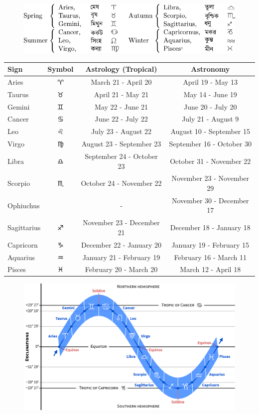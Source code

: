 \documentclass[a4paper,12pt]{extarticle}
\begin{document}
\begin{enumerate}
	\begin{figure}[H]
		\centering
		\includegraphics[width=0.7\linewidth]{zodiac.pdf}
	\end{figure}

\begin{table}[H]
	\centering
\begin{tabular}{|l|c|c|c|}
	\hline 
	\textbf{Sign} & \textbf{Symbol} & \textbf{Astrology (Tropical)} & \textbf{Astronomy} \\ 
	\hline 
	Aries & $\aries$ & March 21 - April 20 & April 19 - May 13 \\ 
	\hline 
	Taurus & $\taurus$ & April 21 - May 21 & May 14 - June 19 \\ 
	\hline 
	Gemini & $\gemini$ & May 22 - June 21 & June 20 - July 20 \\ 
	\hline 
	Cancer & $\cancer$ & June 22 - July 22 & July 21 - August 9 \\ 
	\hline 
	Leo & $\leo$ & July 23 - August 22 & August 10 - September 15 \\ 
	\hline 
	Virgo & $\virgo$ & August 23 - September 23 & September 16 - October 30 \\ 
	\hline 
	Libra & $\libra$ & September 24 - October 23 & October 31 - November 22 \\ 
	\hline 
	Scorpio & $\scorpio$ & October 24 - November 22 & November 23 - November 29 \\ 
	\hline 
	Ophiuchus &  & - & November 30 - December 17 \\ 
	\hline 
	Sagittarius & $\sagittarius$ & November 23 - December 21 & December 18 - January 18 \\ 
	\hline 
	Capricorn & $\capricornus$ & December 22 - January 20 & January 19 - February 15 \\ 
	\hline 
	Aquarius & $\aquarius$ & January 21 - February 19 & February 16 - March 11 \\ 
	\hline 
	Pisces & $\pisces$ & February 20 - March 20 & March 12 - April 18 \\ 
	\hline 
\end{tabular}
\end{table}
	\begin{figure}[H]
		\centering
		\includegraphics[width=0.8\linewidth]{zodiac_dec.png}
	\end{figure}


\end{enumerate}
\end{document}
